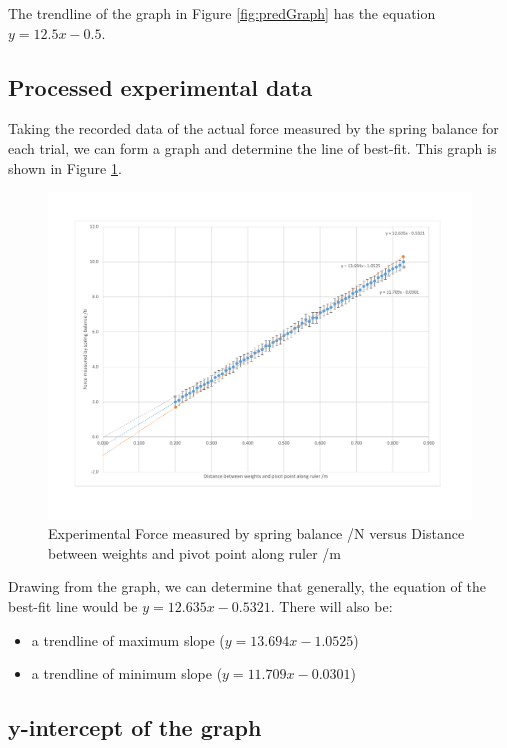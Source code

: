 \documentclass[letterpaper, 12pt]{article}
\begin{document}
The trendline of the graph in Figure \ref*{fig:predGraph}
has the equation $y=12.5x-0.5$.


\subsection{Processed experimental data}

Taking the recorded data of the actual force measured by the spring balance
for each trial, we can form a graph and determine the line of best-fit.
This graph is shown in Figure \ref*{fig:expGraph}.

\begin{figure}[H]
    \centering
    \includegraphics[width=\textwidth]{expGraph.pdf}
    \caption{Experimental Force measured by spring balance /\unit{N} versus Distance between weights and pivot point along ruler /\unit{m}}
    \label{fig:expGraph}
\end{figure}

Drawing from the graph, we can determine that generally,
the equation of the best-fit line would be $y=12.635x - 0.5321$.
There will also be:
\begin{itemize}
    \item a trendline of maximum slope ($y = 13.694x - 1.0525$)
    \item a trendline of minimum slope ($y = 11.709x - 0.0301$)
\end{itemize}

\subsection{y-intercept of the graph}
\end{document}
